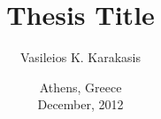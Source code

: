 \documentclass[diploma]{cslabthesis}
\author{Vasileios K. Karakasis}
\title{Thesis Title}
\date{Athens, Greece \\ December, 2012}
\begin{document}
\maketitle




\frontmatter
\cleardoublepage


\cleardoublepage
\tableofcontents

\cleardoublepage
\listoffigures

\cleardoublepage
\listoftables

\cleardoublepage
\listofalgorithms



\mainmatter


\backmatter

\cleardoublepage
\printindex
\end{document}

